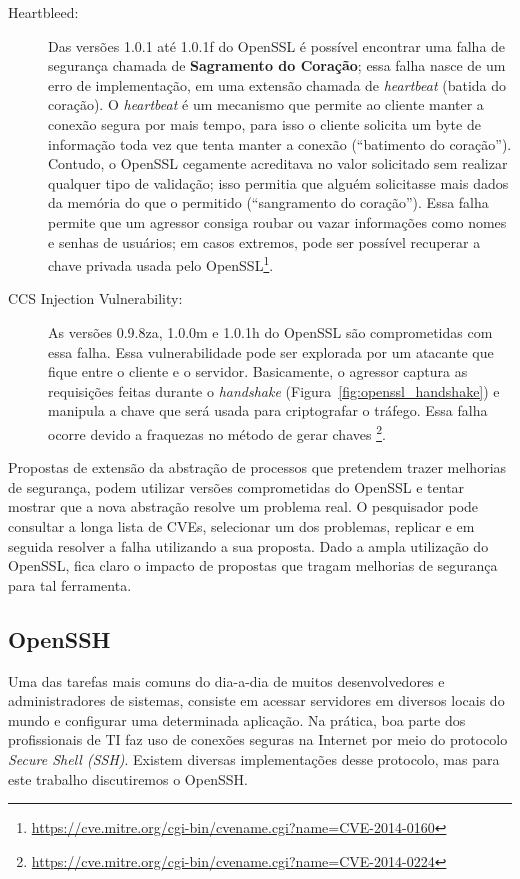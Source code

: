 \begin{description}
  \item [Heartbleed:] Das versões 1.0.1 até 1.0.1f do OpenSSL é possível
encontrar uma falha de segurança chamada de \textbf{Sagramento do Coração};
essa falha nasce de um erro de implementação, em uma extensão chamada de
\emph{heartbeat} (batida do coração). O \emph{heartbeat} é um mecanismo que
permite ao cliente manter a conexão segura por mais tempo, para isso o cliente
solicita um byte de informação toda vez que tenta manter a conexão (``batimento
do coração''). Contudo, o OpenSSL cegamente acreditava no valor solicitado sem
realizar qualquer tipo de validação; isso permitia que alguém solicitasse mais
dados da memória do que o permitido (``sangramento do coração''). Essa falha
permite que um agressor consiga roubar ou vazar informações como nomes e
senhas de usuários; em casos extremos, pode ser possível recuperar a chave
privada usada pelo OpenSSL\footnote{\url{https://cve.mitre.org/cgi-bin/cvename.cgi?name=CVE-2014-0160}}.

  \item [CCS Injection Vulnerability:] As versões 0.9.8za, 1.0.0m e 1.0.1h do
OpenSSL são comprometidas com essa falha. Essa vulnerabilidade pode ser
explorada por um atacante que fique entre o cliente e o servidor.  Basicamente,
o agressor captura as requisições feitas durante o \emph{handshake}
(Figura~\ref{fig:openssl_handshake}) e manipula a chave que será usada para
criptografar o tráfego. Essa falha ocorre devido a fraquezas no método de gerar
chaves
\footnote{\url{https://cve.mitre.org/cgi-bin/cvename.cgi?name=CVE-2014-0224}}.

\end{description}

Propostas de extensão da abstração de processos que pretendem trazer melhorias de
segurança, podem utilizar versões comprometidas do OpenSSL e tentar mostrar que
a nova abstração resolve um problema real. O pesquisador pode consultar a longa
lista de CVEs, selecionar um dos problemas, replicar e em seguida resolver a
falha utilizando a sua proposta. Dado a ampla utilização do OpenSSL, fica claro
o impacto de propostas que tragam melhorias de segurança para tal ferramenta.

\subsection{OpenSSH}

Uma das tarefas mais comuns do dia-a-dia de muitos desenvolvedores e
administradores de sistemas, consiste em acessar servidores em diversos locais
do mundo e configurar uma determinada aplicação. Na prática, boa parte dos
profissionais de TI faz uso de conexões seguras na Internet por meio do
protocolo \emph{Secure Shell (SSH)}. Existem diversas implementações desse
protocolo, mas para este trabalho discutiremos o OpenSSH.

